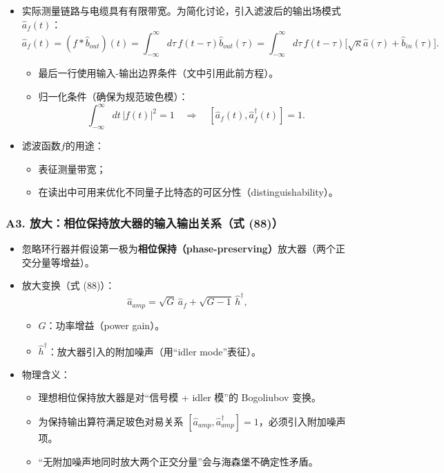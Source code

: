 \documentclass[12pt,a4paper,oneside]{ctexbook}
\providecommand{\tightlist}{%
  \setlength{\itemsep}{0pt}\setlength{\parskip}{0pt}}
\begin{document}
\begin{itemize}
\tightlist
\item
  实际测量链路与电缆具有有限带宽。为简化讨论，引入滤波后的输出场模式
  \(\hat{a}_f(t)\)： \[
  \hat{a}_f(t)=(f*\hat{b}_{out})(t)
  =\int_{-\infty}^{\infty}d\tau\, f(t-\tau)\hat{b}_{out}(\tau)
  =\int_{-\infty}^{\infty}d\tau\, f(t-\tau)\big[\sqrt{\kappa}\hat{a}(\tau)+\hat{b}_{in}(\tau)\big].
  \]

  \begin{itemize}
  \tightlist
  \item
    最后一行使用输入-输出边界条件（文中引用此前方程）。
  \item
    归一化条件（确保为规范玻色模）： \[
    \int_{-\infty}^{\infty}dt\,|f(t)|^2=1 \quad\Rightarrow\quad [\hat{a}_f(t),\hat{a}_f^\dagger(t)]=1 .
    \]
  \end{itemize}
\item
  滤波函数$f$的用途：

  \begin{itemize}
  \tightlist
  \item
    表征测量带宽；
  \item
    在读出中可用来优化不同量子比特态的可区分性（distinguishability）。
  \end{itemize}
\end{itemize}


\subsubsection{A3. 放大：相位保持放大器的输入输出关系（式
(88)）}\label{a3.-ux653eux5927ux76f8ux4f4dux4fddux6301ux653eux5927ux5668ux7684ux8f93ux5165ux8f93ux51faux5173ux7cfbux5f0f-88}

\begin{itemize}
\tightlist
\item
  忽略环行器并假设第一极为\textbf{相位保持（phase-preserving）}放大器（两个正交分量等增益）。
\item
  放大变换（式 (88)）： \[
  \hat{a}_{amp}=\sqrt{G}\,\hat{a}_f+\sqrt{G-1}\,\hat{h}^\dagger ,
  \]

  \begin{itemize}
  \tightlist
  \item
    \(G\)：功率增益（power gain）。
  \item
    \(\hat{h}^\dagger\)：放大器引入的附加噪声（用``idler mode''表征）。
  \end{itemize}
\item
  物理含义：

  \begin{itemize}
  \tightlist
  \item
    理想相位保持放大器是对``信号模 + idler 模''的 Bogoliubov 变换。
  \item
    为保持输出算符满足玻色对易关系
    \([\hat{a}_{amp},\hat{a}_{amp}^\dagger]=1\)，必须引入附加噪声项。
  \item
    ``无附加噪声地同时放大两个正交分量''会与海森堡不确定性矛盾。
  \end{itemize}
\end{itemize}
\end{document}
